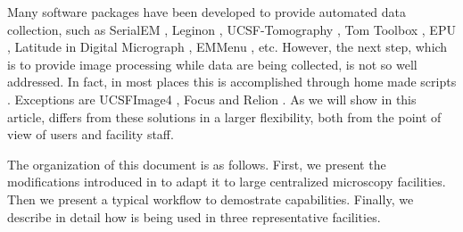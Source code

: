 Many software packages have been developed to provide automated data collection, such as SerialEM \citep{Mastronarde2005}, Leginon \citep{Suloway2009}, UCSF-Tomography \citep{Zheng2007}, Tom Toolbox \citep{Nickell2005}, EPU \citep{EPU}, Latitude in Digital Micrograph \citep{Latitude}, EMMenu \citep{emmenu}, etc. However, the next step,  which is to provide image processing while  data are being collected, is not so well addressed. In fact, in most places this is accomplished through home made scripts \citep[i.e.][]{Pichkur2018}. %
Exceptions are UCSFImage4 \citep{Li2015}, Focus \citep{Biyani2017} and Relion \citep{fernandez2017:relion-pipeline}. As we will show in this article, \scipion differs from these solutions in a larger flexibility, both from the point of view of users and facility staff.

The organization of this document is as follows. First, we present the modifications introduced in \scipion to adapt it to large centralized microscopy facilities. Then we present a typical workflow to demostrate \scipion capabilities. Finally,  we describe in detail how \scipion is being used in three representative facilities.

